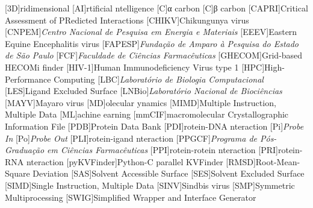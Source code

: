 \documentclass[Ingles]{phdthesis}
\begin{document}
{%
\let\oldnumberline\numberline%
\renewcommand{\numberline}{\tablename~\oldnumberline}%
\listoftables%
}
\clearpage


\begin{acronym} \itemsep=-8pt
  [3D]{ridimensional}
  [AI]{rtificial ntelligence}
  [C\textalpha]{α carbon}
  [C\textbeta]{β carbon}
  [CAPRI]{Critical Assessment of PRedicted Interactions}
  [CHIKV]{Chikungunya virus}
  [CNPEM]{\textit{Centro Nacional de Pesquisa em Energia e Materiais}}
  [EEEV]{Eastern Equine Encephalitis virus}
  [FAPESP]{\textit{Fundação de Amparo à Pesquisa do Estado de São Paulo}}
  [FCF]{\textit{Faculdade de Ciências Farmacêuticas}}
  [GHECOM]{Grid-based HECOMi finder}
  [HIV-1]{Human Immunodeficiency Virus type 1}
  [HPC]{High-Performance Computing}
  [LBC]{\textit{Laboratório de Biologia Computacional}}
  [LES]{Ligand Excluded Surface}
  [LNBio]{\textit{Laboratório Nacional de Biociências}}
  [MAYV]{Mayaro virus}
  [MD]{olecular ynamics}
  [MIMD]{Multiple Instruction, Multiple Data}
  [ML]{achine earning}
  [mmCIF]{macromolecular Crystallographic Information File}
  [PDB]{Protein Data Bank}
  [PDI]{rotein-DNA nteraction}
  [Pi]{\textit{Probe In}}
  [Po]{\textit{Probe Out}}
  [PLI]{rotein-igand nteraction}
  [PPGCF]{\textit{Programa de Pós-Graduação em Ciências Farmacêuticas}}
  [PPI]{rotein-rotein nteraction}
  [PRI]{rotein-RNA nteraction}
  [pyKVFinder]{Python-C parallel KVFinder}
  [RMSD]{Root-Mean-Square Deviation}
  [SAS]{Solvent Accessible Surface}
  [SES]{Solvent Excluded Surface}
  [SIMD]{Single Instruction, Multiple Data}
  [SINV]{Sindbis virus}
  [SMP]{Symmetric Multiprocessing}
  [SWIG]{Simplified Wrapper and Interface Generator}

\end{acronym}
\end{document}
